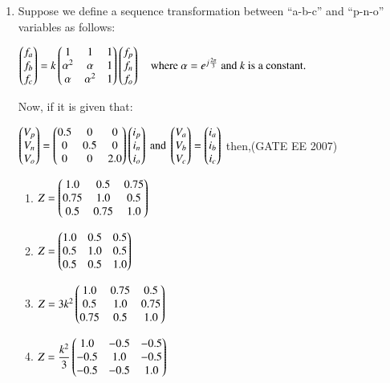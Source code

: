 \documentclass[a4paper,10pt]{exam}
\theoremstyle{remark}
\begin{document}
\begin{enumerate}
\item  \quad
Suppose we define a sequence transformation between ``a-b-c'' and ``p-n-o'' variables as follows:

$
\begin{pmatrix}
f_a \\ f_b \\ f_c
\end{pmatrix}
=
k
\begin{pmatrix}
1 & 1 & 1 \\ 
\alpha^2 & \alpha & 1 \\ 
\alpha & \alpha^2 & 1
\end{pmatrix}
\begin{pmatrix}
f_p \\ f_n \\ f_o
\end{pmatrix}
\quad
\text{where } \alpha = e^{j\frac{2\pi}{3}} \text{ and $k$ is a constant.}
$

Now, if it is given that:

$
\begin{pmatrix} V_p \\ V_n \\ V_o \end{pmatrix} = 
\begin{pmatrix} 
0.5 & 0 & 0 \\
0 & 0.5 & 0 \\
0 & 0 & 2.0
\end{pmatrix}
\begin{pmatrix} i_p \\ i_n \\ i_o \end{pmatrix}
\text{ and }
\begin{pmatrix} V_a \\ V_b \\ V_c \end{pmatrix} = 
\begin{pmatrix} i_a \\ i_b \\ i_c \end{pmatrix}
$
then,\hfill{(GATE EE 2007)} 

\begin{multicols}{2}
\begin{enumerate}
\item  $Z = 
\begin{pmatrix} 
1.0 & 0.5 & 0.75 \\
0.75 & 1.0 & 0.5 \\
0.5 & 0.75 & 1.0 \\
\end{pmatrix}$ 

\item  $Z = 
\begin{pmatrix} 
1.0 & 0.5 & 0.5 \\
0.5 & 1.0 & 0.5 \\
0.5 & 0.5 & 1.0 \\
\end{pmatrix}$ 

\item  $Z = 3k^2
\begin{pmatrix} 
1.0 & 0.75 & 0.5 \\
0.5 & 1.0 & 0.75 \\
0.75 & 0.5 & 1.0 \\
\end{pmatrix}$ 

\item  $Z = \dfrac{k^2}{3}
\begin{pmatrix} 
1.0 & -0.5 & -0.5 \\
-0.5 & 1.0 & -0.5 \\
-0.5 & -0.5 & 1.0 \\
\end{pmatrix}$ 
\end{enumerate}
\end{multicols}



\end{enumerate}
\end{document}

